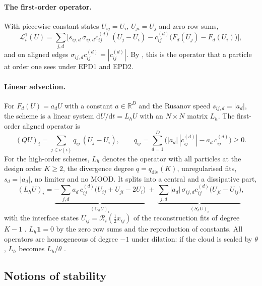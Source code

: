 \documentclass[11pt,a4paper]{article}
\theoremstyle{plain}
\theoremstyle{definition}
\theoremstyle{remark}
\numberwithin{equation}{section}
\newcommand{\R}{\mathbb{R}}
\newcommand{\dd}{\mathrm{d}}
\newcommand{\nb}{\nu}
\newcommand{\Lop}{\mathcal{L}}
\newcommand{\A}[1]{\cite[#1]{Addendum}}
\begin{document}
\paragraph{The first-order operator.} With piecewise constant states $U_{ij}=U_i$, $U_{ji}=U_j$ and zero row sums,
\begin{equation}\label{eq:L1}
\Lop^{1}_i(U)=\sum_{j,d}\Big[s_{ij,d}\,\sigma_{ij,d}c^{(d)}_{ij}\,(U_j-U_i)-c^{(d)}_{ij}\big(F_d(U_j)-F_d(U_i)\big)\Big],
\end{equation}
and on aligned edges $\sigma_{ij,d}c^{(d)}_{ij}=|c^{(d)}_{ij}|$. By \A{Prop.~5.6}, this is the operator that a particle at order one sees under EPD1 and EPD2.

\paragraph{Linear advection.} For $F_d(U)=a_dU$ with a constant $a\in\R^D$ and the Rusanov speed $s_{ij,d}=|a_d|$, the scheme is a linear system $\dd U/\dd t=L_hU$ with an $N\times N$ matrix $L_h$. The first-order aligned operator is
\begin{equation}\label{eq:Q}
(QU)_i=\sum_{j\in\nb(i)}q_{ij}\,(U_j-U_i),\qquad q_{ij}=\sum_{d=1}^D\big(|a_d|\,|c^{(d)}_{ij}|-a_d\,c^{(d)}_{ij}\big)\ge0 .
\end{equation}
For the high-order schemes, $L_h$ denotes the operator with all particles at the design order $K\ge2$, the divergence degree $q=q_{\mathrm{div}}(K)$, unregularised fits, $s_d=|a_d|$, no limiter and no MOOD. It splits into a central and a dissipative part,
\begin{equation}\label{eq:split}
(L_hU)_i=\underbrace{-\sum_{j,d}a_d\,c^{(d)}_{ij}\big(U_{ij}+U_{ji}-2U_i\big)}_{(C_hU)_i}\ +\ \underbrace{\sum_{j,d}|a_d|\,\sigma_{ij,d}c^{(d)}_{ij}\big(U_{ji}-U_{ij}\big)}_{(S_hU)_i},
\end{equation}
with the interface states $U_{ij}=\mathcal R_i(\tfrac12x_{ij})$ of the reconstruction fits of degree $K-1$ \A{(4.1)}. $L_h\mathbf 1=0$ by the zero row sums \A{Lem.~3.3(ii)} and the reproduction of constants. All operators are homogeneous of degree $-1$ under dilation: if the cloud is scaled by $\theta$, $L_h$ becomes $L_h/\theta$ \A{Lem.~3.3(iii)}.

\subsection{Notions of stability}
\end{document}
